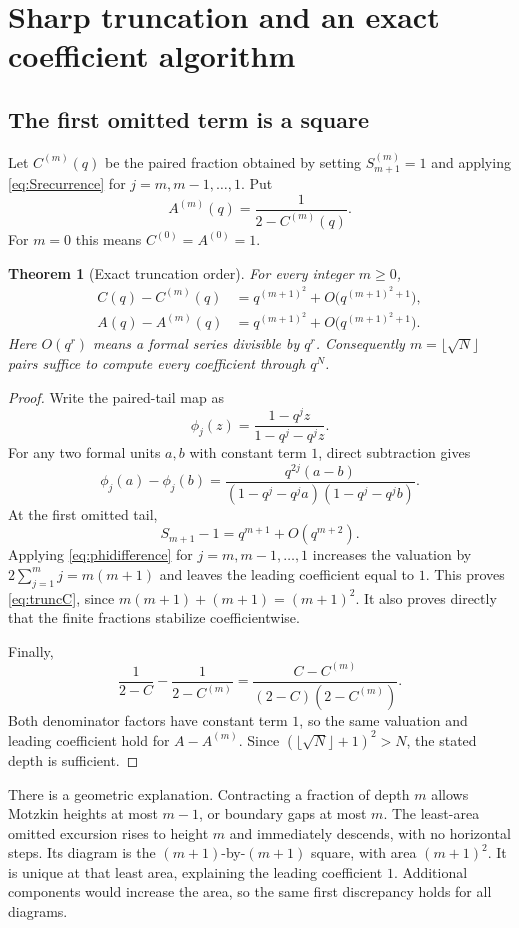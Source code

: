 \documentclass[11pt,letterpaper]{article}
\numberwithin{equation}{section}
\newtheorem{theorem}{Theorem}[section]
\theoremstyle{definition}
\begin{document}
\section{Sharp truncation and an exact coefficient algorithm}
\label{sec:truncation}

\subsection{The first omitted term is a square}
Let $C^{(m)}(q)$ be the paired fraction obtained by setting
$S_{m+1}^{(m)}=1$ and applying \eqref{eq:Srecurrence} for
$j=m,m-1,\ldots,1$. Put
\[
 A^{(m)}(q)=\frac{1}{2-C^{(m)}(q)}.
\]
For $m=0$ this means $C^{(0)}=A^{(0)}=1$.

\begin{theorem}[Exact truncation order]
\label{thm:truncation}
For every integer $m\ge0$,
\begin{align}
 C(q)-C^{(m)}(q)&=q^{(m+1)^2}+O\bigl(q^{(m+1)^2+1}\bigr),
 \label{eq:truncC}\\
 A(q)-A^{(m)}(q)&=q^{(m+1)^2}+O\bigl(q^{(m+1)^2+1}\bigr).
 \label{eq:truncA}
\end{align}
Here $O(q^r)$ means a formal series divisible by $q^r$.
Consequently $m=\lfloor\sqrt N\rfloor$ pairs suffice to compute every
coefficient through $q^N$.
\end{theorem}
\begin{proof}
Write the paired-tail map as
\[
 \phi_j(z)=\frac{1-q^jz}{1-q^j-q^jz}.
\]
For any two formal units $a,b$ with constant term $1$, direct subtraction
gives
\begin{equation}
 \phi_j(a)-\phi_j(b)=
 \frac{q^{2j}(a-b)}
 {(1-q^j-q^ja)(1-q^j-q^jb)}.
 \label{eq:phidifference}
\end{equation}
At the first omitted tail,
\[
 S_{m+1}-1=q^{m+1}+O(q^{m+2}).
\]
Applying \eqref{eq:phidifference} for $j=m,m-1,\ldots,1$ increases the
valuation by
$2\sum_{j=1}^m j=m(m+1)$ and leaves the leading coefficient equal to $1$.
This proves \eqref{eq:truncC}, since
$m(m+1)+(m+1)=(m+1)^2$. It also proves directly that the finite fractions
stabilize coefficientwise.

Finally,
\[
 \frac{1}{2-C}-\frac{1}{2-C^{(m)}}=
 \frac{C-C^{(m)}}{(2-C)(2-C^{(m)})}.
\]
Both denominator factors have constant term $1$, so the same valuation and
leading coefficient hold for $A-A^{(m)}$. Since
$(\lfloor\sqrt N\rfloor+1)^2>N$, the stated depth is sufficient.
\end{proof}

There is a geometric explanation. Contracting a fraction of depth $m$
allows Motzkin heights at most $m-1$, or boundary gaps at most $m$. The
least-area omitted excursion rises to height $m$ and immediately descends,
with no horizontal steps. Its diagram is the $(m+1)$-by-$(m+1)$ square,
with area $(m+1)^2$. It is unique at that least area, explaining the leading
coefficient $1$. Additional components would increase the area, so the
same first discrepancy holds for all diagrams.
\end{document}
